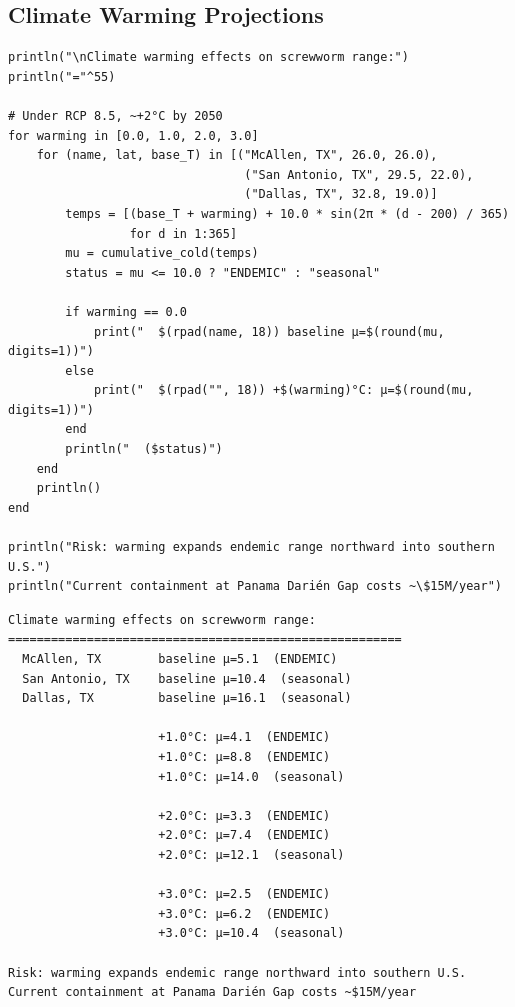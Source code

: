 \subsection{Climate Warming Projections}



\label{11474959944943475787}{}



\begin{verbatim}
println("\nClimate warming effects on screwworm range:")
println("="^55)

# Under RCP 8.5, ~+2°C by 2050
for warming in [0.0, 1.0, 2.0, 3.0]
    for (name, lat, base_T) in [("McAllen, TX", 26.0, 26.0),
                                 ("San Antonio, TX", 29.5, 22.0),
                                 ("Dallas, TX", 32.8, 19.0)]
        temps = [(base_T + warming) + 10.0 * sin(2π * (d - 200) / 365)
                 for d in 1:365]
        mu = cumulative_cold(temps)
        status = mu <= 10.0 ? "ENDEMIC" : "seasonal"

        if warming == 0.0
            print("  $(rpad(name, 18)) baseline µ=$(round(mu, digits=1))")
        else
            print("  $(rpad("", 18)) +$(warming)°C: µ=$(round(mu, digits=1))")
        end
        println("  ($status)")
    end
    println()
end

println("Risk: warming expands endemic range northward into southern U.S.")
println("Current containment at Panama Darién Gap costs ~\$15M/year")
\end{verbatim}




\begin{verbatim}
Climate warming effects on screwworm range:
=======================================================
  McAllen, TX        baseline µ=5.1  (ENDEMIC)
  San Antonio, TX    baseline µ=10.4  (seasonal)
  Dallas, TX         baseline µ=16.1  (seasonal)

                     +1.0°C: µ=4.1  (ENDEMIC)
                     +1.0°C: µ=8.8  (ENDEMIC)
                     +1.0°C: µ=14.0  (seasonal)

                     +2.0°C: µ=3.3  (ENDEMIC)
                     +2.0°C: µ=7.4  (ENDEMIC)
                     +2.0°C: µ=12.1  (seasonal)

                     +3.0°C: µ=2.5  (ENDEMIC)
                     +3.0°C: µ=6.2  (ENDEMIC)
                     +3.0°C: µ=10.4  (seasonal)

Risk: warming expands endemic range northward into southern U.S.
Current containment at Panama Darién Gap costs ~$15M/year
\end{verbatim}



